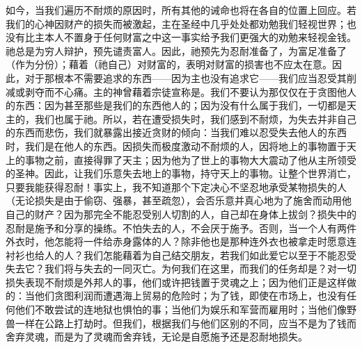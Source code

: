 如今，当我们遍历不耐烦的原因时，所有其他的诫命也将在各自的位置上回应。若我们的心神因财产的损失而被激起，主在圣经中几乎处处都劝勉我们轻视世界；也没有比主本人不置身于任何财富之中这一事实给予我们更强大的劝勉来轻视金钱。祂总是为穷人辩护，预先谴责富人。因此，祂预先为忍耐准备了，为富足准备了（作为分份）；藉着（祂自己）对财富的，表明对财富的损害也不应太在意。因此，对于那根本不需要追求的东西——因为主也没有追求它——我们应当忍受其削减或剥夺而不心痛。主的神曾藉着宗徒宣称是。我们不要认为那仅仅在于贪图他人的东西：因为甚至那些是我们的东西他人的；因为没有什么属于我们，一切都是天主的，我们也属于祂。所以，若在遭受损失时，我们感到不耐烦，为失去并非自己的东西而悲伤，我们就暴露出接近贪财的倾向：当我们难以忍受失去他人的东西时，我们是在他人的东西。因损失而极度激动不耐烦的人，因将地上的事物置于天上的事物之前，直接得罪了天主；因为他为了世上的事物大大震动了他从主所领受的圣神。因此，让我们乐意失去地上的事物，持守天上的事物。让整个世界消亡，只要我能获得忍耐！事实上，我不知道那个下定决心不坚忍地承受某物损失的人（无论损失是由于偷窃、强暴，甚至疏忽），会否乐意并真心地为了施舍而动用他自己的财产？因为那完全不能忍受别人切割的人，自己却在身体上拔剑？损失中的忍耐是施予和分享的操练。不怕失去的人，不会厌于施予。否则，当一个人有两件外衣时，他怎能将一件给赤身露体的人？除非他也是那种连外衣也被拿走时愿意连衬衫也给人的人？我们怎能藉着为自己结交朋友，若我们如此爱它以至于不能忍受失去它？我们将与失去的一同灭亡。为何我们在这里，而我们的任务却是？对一切损失表现不耐烦是外邦人的事，他们或许把钱置于灵魂之上；因为他们正是这样做的：当他们贪图利润而遭遇海上贸易的危险时；为了钱，即使在市场上，也没有任何他们不敢尝试的连地狱也惧怕的事；当他们为娱乐和军营而雇用时；当他们像野兽一样在公路上打劫时。但我们，根据我们与他们区别的不同，应当不是为了钱而舍弃灵魂，而是为了灵魂而舍弃钱，无论是自愿施予还是忍耐地损失。\par



